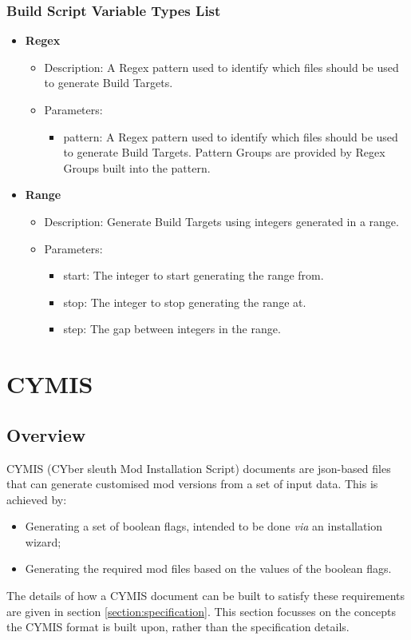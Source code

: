 \documentclass{article}
\begin{document}
\subsubsection{Build Script Variable Types List}
\begin{itemize}
	\item \textbf{Regex}
	\begin{itemize}
		\item Description: A Regex pattern used to identify which files should be used to generate Build Targets.
		\item Parameters:
		\begin{itemize}
			\item pattern: A Regex pattern used to identify which files should be used to generate Build Targets. Pattern Groups are provided by Regex Groups built into the pattern.
		\end{itemize}
	\end{itemize}
	
	\item \textbf{Range}
	\begin{itemize}
		\item Description: Generate Build Targets using integers generated in a range.
		\item Parameters:
		\begin{itemize}
			\item start: The integer to start generating the range from.
			\item stop: The integer to stop generating the range at.
			\item step: The gap between integers in the range.
		\end{itemize}
	\end{itemize}
\end{itemize}
\newpage
\section{CYMIS}\label{Section:CYMIS}

\subsection{Overview}
CYMIS (CYber sleuth Mod Installation Script) documents are json-based files that can generate customised mod versions from a set of input data. This is achieved by:
\begin{itemize}
\item Generating a set of boolean flags, intended to be done \textit{via} an installation wizard;
\item Generating the required mod files based on the values of the boolean flags.
\end{itemize}
The details of how a CYMIS document can be built to satisfy these requirements are given in section \ref{section:specification}. This section focusses on the concepts the CYMIS format is built upon, rather than the specification details.
\end{document}
